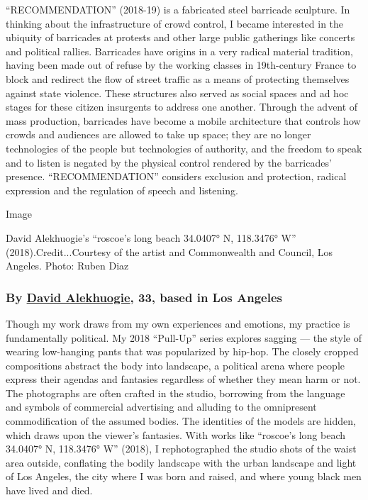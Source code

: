 ``RECOMMENDATION'' (2018-19) is a fabricated steel barricade sculpture.
In thinking about the infrastructure of crowd control, I became
interested in the ubiquity of barricades at protests and other large
public gatherings like concerts and political rallies. Barricades have
origins in a very radical material tradition, having been made out of
refuse by the working classes in 19th-century France to block and
redirect the flow of street traffic as a means of protecting themselves
against state violence. These structures also served as social spaces
and ad hoc stages for these citizen insurgents to address one another.
Through the advent of mass production, barricades have become a mobile
architecture that controls how crowds and audiences are allowed to take
up space; they are no longer technologies of the people but technologies
of authority, and the freedom to speak and to listen is negated by the
physical control rendered by the barricades' presence.
``RECOMMENDATION'' considers exclusion and protection, radical
expression and the regulation of speech and listening.

Image

David Alekhuogie's ``roscoe's long beach 34.0407° N, 118.3476° W''
(2018).Credit...Courtesy of the artist and Commonwealth and Council, Los
Angeles. Photo: Ruben Diaz

\hypertarget{by-david-alekhuogie-33-based-in-los-angeles}{%
\subsubsection{\texorpdfstring{\textbf{By}
\textbf{\href{https://www.davidalekhuogie.com/}{David Alekhuogie}, 33,
based in Los
Angeles}}{By David Alekhuogie, 33, based in Los Angeles}}\label{by-david-alekhuogie-33-based-in-los-angeles}}

Though my work draws from my own experiences and emotions, my practice
is fundamentally political. My 2018 ``Pull-Up'' series explores sagging
--- the style of wearing low-hanging pants that was popularized by
hip-hop. The closely cropped compositions abstract the body into
landscape, a political arena where people express their agendas and
fantasies regardless of whether they mean harm or not. The photographs
are often crafted in the studio, borrowing from the language and symbols
of commercial advertising and alluding to the omnipresent
commodification of the assumed bodies. The identities of the models are
hidden, which draws upon the viewer's fantasies. With works like
``roscoe's long beach 34.0407° N, 118.3476° W'' (2018), I rephotographed
the studio shots of the waist area outside, conflating the bodily
landscape with the urban landscape and light of Los Angeles, the city
where I was born and raised, and where young black men have lived and
died.

